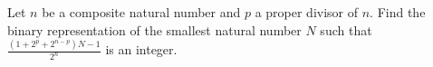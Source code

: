 Let $n$ be a composite natural number and $p$ a proper divisor of $n$. Find the binary representation of the smallest natural number $N$ such that $\frac{(1+2^p+2^{n-p})N-1}{2^n}$ is an integer.
